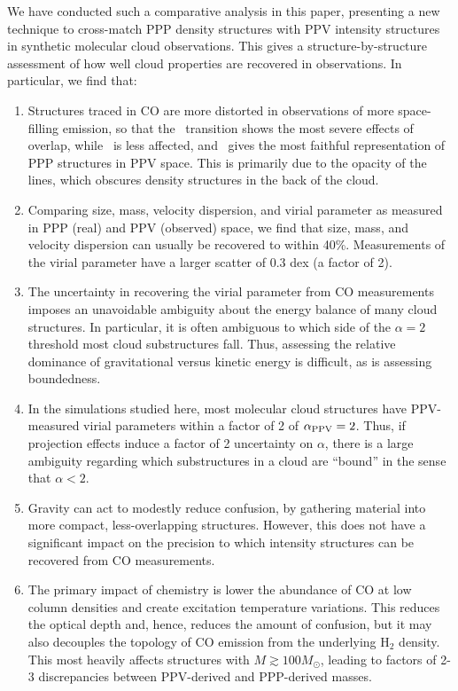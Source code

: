 We have conducted such a comparative analysis in this paper, presenting a new technique to cross-match PPP density structures with PPV intensity structures in synthetic molecular cloud observations. This gives a structure-by-structure assessment of how well cloud properties are recovered in observations. In particular, we find that:

\begin{enumerate}
\item {Structures traced in CO are more distorted in observations of more space-filling emission, so that the \coa\, transition shows the most severe effects of overlap, while \cob\, is less affected, and \coc\, gives the most faithful representation of PPP structures in PPV space. This is primarily due to the opacity of the lines, which obscures density structures in the back of the cloud.}
\item Comparing size, mass, velocity dispersion, and virial parameter as measured in PPP (real) and PPV (observed) space, we find that size, mass, and velocity dispersion can usually be recovered to within 40\%. Measurements of the virial parameter have a larger scatter of 0.3 dex (a factor of 2).
\item The uncertainty in recovering the virial parameter from CO measurements imposes an unavoidable ambiguity about the energy balance of many cloud structures. In particular, it is often ambiguous to which side of the $\alpha = 2$ threshold most cloud substructures fall. Thus, assessing the relative dominance of gravitational versus kinetic energy is difficult, as is assessing boundedness.
\item In the simulations studied here, most molecular cloud structures have PPV-measured virial parameters within a factor of 2 of $\alpha_{\rm PPV} = 2$. Thus, if projection effects induce a factor of 2 uncertainty on $\alpha$, there is a large ambiguity regarding which substructures in a cloud are ``bound'' in the sense that $\alpha < 2$.
\item Gravity can act to modestly reduce confusion, by gathering material into more compact, less-overlapping structures. However, this does not have a significant impact on the precision to which intensity structures can be recovered from CO measurements.
\item The primary impact of chemistry is lower the abundance of CO at low column densities and create excitation temperature variations. This reduces the optical depth and, hence, reduces the amount of confusion, but it may also decouples the topology of CO emission from the underlying H$_2$ density. This most heavily affects structures with $M \gtrsim 100M_\odot$, leading to factors of 2-3 discrepancies between PPV-derived and PPP-derived masses.
\end{enumerate}

